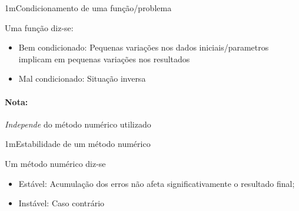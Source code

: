 \documentclass[./CN_A-Slides_Anotacoes.tex]{subfiles}
\begin{document}
\begin{sectionBox}1m{Condicionamento de uma função/problema} %

  Uma função diz-se:
  \begin{itemize}
    \item \textcolor{\Emph{green}}{Bem condicionado:} Pequenas variações nos dados iniciais/parametros implicam em pequenas variações nos resultados
    \item \textcolor{\Emph{red}}{Mal condicionado:} Situação inversa
  \end{itemize}
  \paragraph{Nota:} \emph{Independe} do método numérico utilizado

\end{sectionBox}

\begin{sectionBox}1m{Estabilidade de um método numérico} %

  Um método numérico diz-se
  \begin{itemize}
    \item \textcolor{\Emph{green}}{Estável:} Acumulação dos erros não afeta significativamente o resultado final;
    \item \textcolor{\Emph{red}}{Instável: } Caso contrário
  \end{itemize}

\end{sectionBox}
\end{document}
